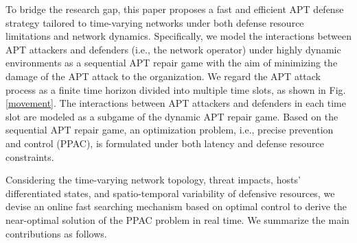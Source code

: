 \documentclass[lettersize,journal]{IEEEtran}
\begin{document}
\begin{figure*}[!t]
\centering
{}
\hfil
{}
\hfil
{}
\hfil
\caption{ The lateral movement attack on the entire dynamic network organization after the attacker obtains the ingress machine. The red nodes indicate the machines that have been hijacked. The red dashed lines indicate the potential targets of the lateral movement attack. The change of topology in (a)-(c) indicates the change of network topology.}
\label{movement}
\end{figure*} 
  

To bridge the research gap, this paper proposes a fast and efficient APT defense strategy tailored to time-varying networks under both defense resource limitations and network dynamics.
Specifically, we model the interactions between APT attackers and defenders (i.e., the network operator) under highly dynamic environments as a sequential APT repair game with the aim of minimizing the damage of the APT attack to the organization. We regard the APT attack process as a finite time horizon divided into multiple time slots, as shown in Fig. \ref{movement}. The interactions between APT attackers and defenders in each time slot are modeled as a subgame of the dynamic APT repair game. Based on the sequential APT repair game, an optimization problem, i.e., precise prevention and control (PPAC), is formulated under both latency and defense resource constraints.
 
 Considering the time-varying network topology, threat impacts, hosts' differentiated states, and spatio-temporal variability of defensive resources, we devise an online fast searching mechanism based on optimal control to derive the near-optimal solution of the PPAC problem in real time. We summarize the main contributions as follows.
\end{document}
